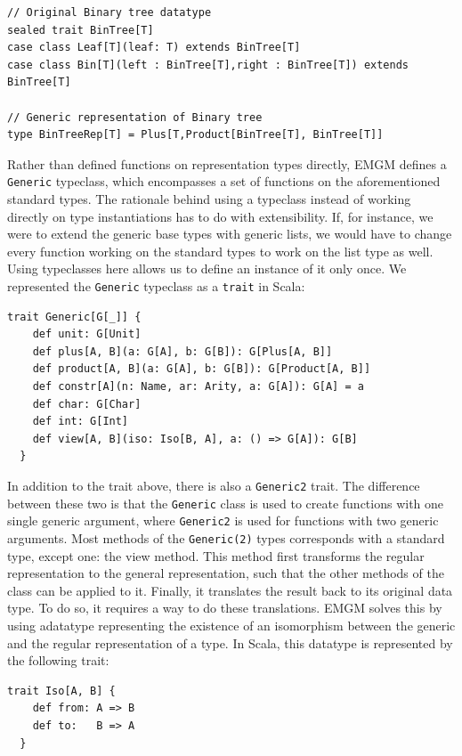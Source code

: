 \documentclass[a4paper]{article}
\newcommand{\scala}[1]{\lstinline[basicstyle=\ttfamily\color{white},style=scala]|#1|}
\begin{document}
\begin{lstlisting}[style=Scala]
// Original Binary tree datatype
sealed trait BinTree[T]
case class Leaf[T](leaf: T) extends BinTree[T]
case class Bin[T](left : BinTree[T],right : BinTree[T]) extends BinTree[T]

// Generic representation of Binary tree
type BinTreeRep[T] = Plus[T,Product[BinTree[T], BinTree[T]]
\end{lstlisting}

Rather than defined functions on representation types directly, EMGM defines a \texttt{Generic} typeclass, which encompasses a set of functions on the aforementioned standard types. The rationale behind using a typeclass instead of working directly on type instantiations has to do with extensibility. If, for instance, we were to extend the generic base types with generic lists, we would have to change every function working on the standard types to work on the list type as well. Using typeclasses here allows us to define an instance of it only once. We represented the \texttt{Generic} typeclass as a \scala{trait} in Scala:

\begin{lstlisting}[style=Scala]
  trait Generic[G[_]] {
    def unit: G[Unit]
    def plus[A, B](a: G[A], b: G[B]): G[Plus[A, B]]
    def product[A, B](a: G[A], b: G[B]): G[Product[A, B]]
    def constr[A](n: Name, ar: Arity, a: G[A]): G[A] = a
    def char: G[Char]
    def int: G[Int]
    def view[A, B](iso: Iso[B, A], a: () => G[A]): G[B]
  }
 \end{lstlisting}

In addition to the trait above, there is also a \texttt{Generic2}  trait. The difference between these two is that the \texttt{Generic} class is used to create functions with one single generic argument, where \texttt{Generic2} is used for functions with two generic arguments. Most methods of the \texttt{Generic(2)} types corresponds with a standard type, except one: the view method.  This method first transforms the regular representation to the general representation, such that the other methods of the class can be applied to it. Finally, it translates the result back to its original data type. To do so, it requires a way to do these translations. EMGM solves this by using adatatype representing the existence of an isomorphism between the generic and the regular representation of a type. In Scala, this datatype is represented by the following trait:

\begin{lstlisting}[style=scala]
 trait Iso[A, B] {
    def from: A => B
    def to:   B => A
  }
\end{lstlisting}
\end{document}
